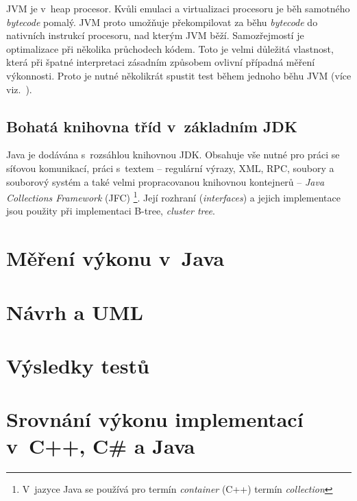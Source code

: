 JVM je v~heap procesor. Kvůli emulaci a virtualizaci procesoru je
běh samotného \emph{bytecode} pomalý. JVM proto umožňuje překompilovat
za běhu \emph{bytecode} do nativních instrukcí procesoru, nad kterým
JVM běží\@. Samozřejmostí je optimalizace při několika průchodech
kódem\@. Toto je velmi důležitá vlastnost, která při špatné interpretaci
zásadním způsobem ovlivní případná měření výkonnosti\@. Proto je
nutné několikrát spustit test během jednoho běhu JVM (více viz.~)\@.


\subsection{Bohatá knihovna tříd v~základním JDK}

Java je dodávána s~rozsáhlou knihovnou JDK\@. Obsahuje vše nutné
pro práci se síťovou komunikací, práci s~textem -- regulární výrazy,
XML, RPC, soubory a souborový
systém a také velmi propracovanou knihovnou kontejnerů -- \emph{Java
Collections Framework }(JFC)%
\footnote{V~jazyce Java se používá pro termín\emph{ container} (C++) termín
\emph{collection} %
}\@. Její rozhraní (\emph{interfaces}) a jejich implementace jsou
použity při implementaci B-tree, \emph{cluster tree}.


\section{Měření výkonu v~Java\label{sub:M=00011B=000159en=0000ED-v=0000FDkonu-vJava}}


\section{Návrh a UML}


\section{Výsledky testů}


\section{Srovnání výkonu implementací v~C++, C\# a Java}
